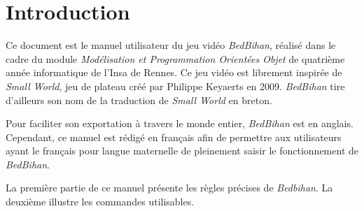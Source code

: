 \section*{Introduction}
	
	Ce document est le manuel utilisateur du jeu vidéo \emph{BedBihan}, réalisé dans le cadre du module \emph{Modélisation et Programmation Orientées Objet} de quatrième année informatique de l'{\sc Insa} de Rennes. Ce jeu vidéo est librement inspirée de \emph{Small World}, jeu de plateau créé par Philippe Keyaerts en 2009. \emph{BedBihan} tire d'ailleurs son nom de la traduction de \emph{Small World} en breton.
	
	Pour faciliter son exportation à travers le monde entier, \emph{BedBihan} est en anglais. Cependant, ce manuel est rédigé en français afin de permettre aux utilisateurs ayant le français pour langue maternelle de pleinement saisir le fonctionnement de \emph{BedBihan}.

	La première partie de ce manuel présente les règles précises de \emph{Bedbihan}. La deuxième illustre les commandes utilisables. 
	


	












